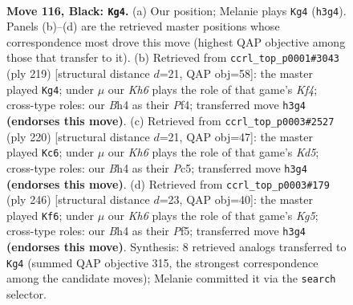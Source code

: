 \documentclass[11pt]{article}
\begin{document}
\clearpage

\begin{figure}[p]\centering
\begin{subfigure}{0.46\textwidth}\centering
\resizebox{\linewidth}{!}{%
\newchessgame
\chessboard[
  setfen={5n2/8/7p/3rp3/7b/1R5k/2Kp4/8 b - - 3 116},
  showmover=false,
  pgfstyle=straightmove, color=movearrow, markmove={h3-g4}
]}
\caption{}
\end{subfigure}\hfill
\begin{subfigure}{0.46\textwidth}\centering
\resizebox{\linewidth}{!}{%
\newchessgame
\chessboard[
  setfen={8/8/7r/R4k2/5p2/7p/7K/8 b - - 79 110},
  showmover=false,
  pgfstyle=straightmove, color=movearrow, markmove={f5-g4}
]}
\caption{}
\end{subfigure}
\\[4pt]
\begin{subfigure}{0.46\textwidth}\centering
\resizebox{\linewidth}{!}{%
\newchessgame
\chessboard[
  setfen={8/k7/P7/2PK4/R7/8/8/3r4 w - - 61 111},
  showmover=false,
  pgfstyle=straightmove, color=movearrow, markmove={d5-c6}
]}
\caption{}
\end{subfigure}\hfill
\begin{subfigure}{0.46\textwidth}\centering
\resizebox{\linewidth}{!}{%
\newchessgame
\chessboard[
  setfen={6r1/7k/7P/5PK1/8/7R/8/8 w - - 75 124},
  showmover=false,
  pgfstyle=straightmove, color=movearrow, markmove={g5-f6}
]}
\caption{}
\end{subfigure}
\caption{\textbf{Move 116, Black: \texttt{Kg4}.} (a) Our position; Melanie plays \texttt{Kg4} (\texttt{h3g4}). Panels (b)--(d) are the retrieved master positions whose correspondence most drove this move (highest QAP objective among those that transfer to it). (b) Retrieved from \texttt{ccrl\_top\_p0001\#3043} (ply 219) [structural distance $d$=21, QAP obj=58]: the master played \texttt{Kg4}; under $\mu$ our \emph{Kh6} plays the role of that game's \emph{Kf4}; cross-type roles: our \emph{B}h4 as their \emph{P}f4; transferred move \texttt{h3g4} \textbf{(endorses this move)}. (c) Retrieved from \texttt{ccrl\_top\_p0003\#2527} (ply 220) [structural distance $d$=21, QAP obj=47]: the master played \texttt{Kc6}; under $\mu$ our \emph{Kh6} plays the role of that game's \emph{Kd5}; cross-type roles: our \emph{B}h4 as their \emph{P}c5; transferred move \texttt{h3g4} \textbf{(endorses this move)}. (d) Retrieved from \texttt{ccrl\_top\_p0003\#179} (ply 246) [structural distance $d$=23, QAP obj=40]: the master played \texttt{Kf6}; under $\mu$ our \emph{Kh6} plays the role of that game's \emph{Kg5}; cross-type roles: our \emph{B}h4 as their \emph{P}f5; transferred move \texttt{h3g4} \textbf{(endorses this move)}. Synthesis: 8 retrieved analogs transferred to \texttt{Kg4} (summed QAP objective 315, the strongest correspondence among the candidate moves); Melanie committed it via the \texttt{search} selector.}
\label{fig:thought-m231}
\end{figure}
\end{document}
